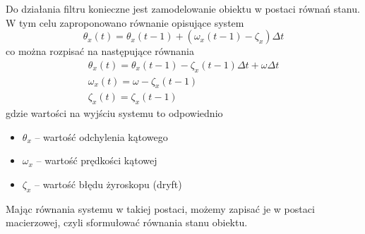 Do działania filtru konieczne jest zamodelowanie obiektu w postaci równań stanu. W tym celu zaproponowano równanie opisujące system
$$
    \theta_x(t) = \theta_x(t-1) + (\omega_x(t-1) - \zeta_x)\Delta t
$$
co można rozpisać na następujące równania
\begin{equation}
    \begin{array}{l}
        \theta_x(t) = \theta_x(t-1) - \zeta_x(t-1)\Delta t + \omega\Delta t \\
        \omega_x(t) = \omega - \zeta_x(t-1) \\
        \zeta_x(t) = \zeta_x(t-1)
    \end{array}
    \label{Rownania obiektu}
\end{equation}
gdzie wartości na wyjściu systemu to odpowiednio
\begin{itemize}
    \item $\theta_x$ -- wartość odchylenia kątowego 
    \item $\omega_x$ -- wartość prędkości kątowej 
    \item $\zeta_x$ -- wartość błędu żyroskopu (dryft)
\end{itemize}

Mając równania systemu w takiej postaci, możemy zapisać je w postaci macierzowej, czyli sformułować równania stanu obiektu.
